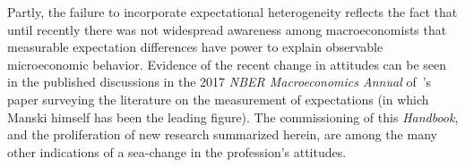 Partly, the failure to incorporate expectational heterogeneity reflects the fact that until recently there was not widespread awareness among macroeconomists that measurable expectation differences have power to explain observable microeconomic behavior.  Evidence of the recent change in attitudes can be seen in the published discussions in the 2017 \textit{NBER Macroeconomics Annual} of~\cite{manski2017survey}'s paper surveying the literature on the measurement of expectations (in which Manski himself has been the leading figure).  The commissioning of this \emph{Handbook}, and the proliferation of new research summarized herein, are among the many other indications of a sea-change in the profession's attitudes.%






